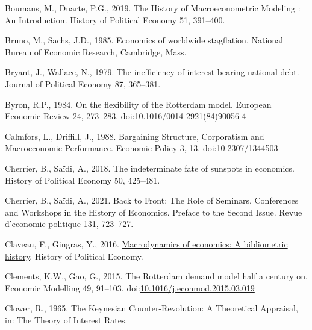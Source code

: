 \documentclass[
  12pt,
  onecolumn]{article}
\newlength{\cslhangindent}
\newlength{\cslentryspacingunit} %
\newenvironment{CSLReferences}[2] %
 {%
  \setlength{\parindent}{0pt}
  \ifodd #1
  \let\oldpar\par
  \def\par{\hangindent=\cslhangindent\oldpar}
  \fi
  \setlength{\parskip}{#2\cslentryspacingunit}
 }%
 {}
\begin{document}
\begin{CSLReferences}{1}{0}
\leavevmode{}%
Boumans, M., Duarte, P.G., 2019. The {History} of {Macroeconometric Modeling} : {An Introduction}. History of Political Economy 51, 391--400.

\leavevmode{}%
Bruno, M., Sachs, J.D., 1985. Economics of worldwide stagflation. {National Bureau of Economic Research}, {Cambridge, Mass.}

\leavevmode{}%
Bryant, J., Wallace, N., 1979. The inefficiency of interest-bearing national debt. Journal of Political Economy 87, 365--381.

\leavevmode{}%
Byron, R.P., 1984. On the flexibility of the {Rotterdam} model. European Economic Review 24, 273--283. doi:\href{https://doi.org/10.1016/0014-2921(84)90056-4}{10.1016/0014-2921(84)90056-4}

\leavevmode{}%
Calmfors, L., Driffill, J., 1988. Bargaining {Structure}, {Corporatism} and {Macroeconomic Performance}. Economic Policy 3, 13. doi:\href{https://doi.org/10.2307/1344503}{10.2307/1344503}

\leavevmode{}%
Cherrier, B., Saïdi, A., 2018. The indeterminate fate of sunspots in economics. History of Political Economy 50, 425--481.

\leavevmode{}%
Cherrier, B., Saïdi, A., 2021. Back to {Front}: {The Role} of {Seminars}, {Conferences} and {Workshops} in the {History} of {Economics}. {Preface} to the {Second Issue}. Revue d'economie politique 131, 723--727.

\leavevmode{}%
Claveau, F., Gingras, Y., 2016. \href{http://hope.dukejournals.org/cgi/content/short/48/4/551?rss=1}{Macrodynamics of economics: A bibliometric history}. History of Political Economy.

\leavevmode{}%
Clements, K.W., Gao, G., 2015. The {Rotterdam} demand model half a century on. Economic Modelling 49, 91--103. doi:\href{https://doi.org/10.1016/j.econmod.2015.03.019}{10.1016/j.econmod.2015.03.019}

\leavevmode{}%
Clower, R., 1965. The {Keynesian Counter-Revolution}: {A Theoretical Appraisal}, in: The {Theory} of {Interest Rates}.


\end{CSLReferences}
\end{document}

